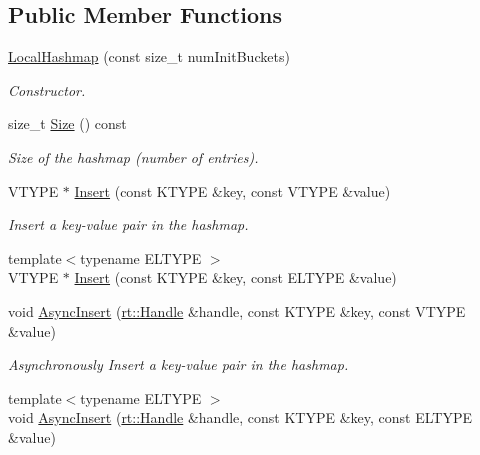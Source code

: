 \subsection*{Public Member Functions}
\begin{DoxyCompactItemize}
\item 
\hyperlink{classshad_1_1LocalHashmap_a6c0ce5d7583545126171e9de452b89d9}{Local\-Hashmap} (const size\-\_\-t num\-Init\-Buckets)
\begin{DoxyCompactList}\small\item\em Constructor. \end{DoxyCompactList}\item 
size\-\_\-t \hyperlink{classshad_1_1LocalHashmap_ac70c307f612b97f08f5e38bba7759665}{Size} () const 
\begin{DoxyCompactList}\small\item\em Size of the hashmap (number of entries). \end{DoxyCompactList}\item 
V\-T\-Y\-P\-E $\ast$ \hyperlink{classshad_1_1LocalHashmap_af3ef8afed1593bf034477b8692661b97}{Insert} (const K\-T\-Y\-P\-E \&key, const V\-T\-Y\-P\-E \&value)
\begin{DoxyCompactList}\small\item\em Insert a key-\/value pair in the hashmap. \end{DoxyCompactList}\item 
{\footnotesize template$<$typename E\-L\-T\-Y\-P\-E $>$ }\\V\-T\-Y\-P\-E $\ast$ \hyperlink{classshad_1_1LocalHashmap_ad8062ff16023002c7aee667f3fe4cfd2}{Insert} (const K\-T\-Y\-P\-E \&key, const E\-L\-T\-Y\-P\-E \&value)
\item 
void \hyperlink{classshad_1_1LocalHashmap_acb5581492e044c07bd0ceaa3a6892309}{Async\-Insert} (\hyperlink{classshad_1_1rt_1_1Handle}{rt\-::\-Handle} \&handle, const K\-T\-Y\-P\-E \&key, const V\-T\-Y\-P\-E \&value)
\begin{DoxyCompactList}\small\item\em Asynchronously Insert a key-\/value pair in the hashmap. \end{DoxyCompactList}\item 
{\footnotesize template$<$typename E\-L\-T\-Y\-P\-E $>$ }\\void \hyperlink{classshad_1_1LocalHashmap_ace0dd4d4a9caee1d915af6efcb4fc2c6}{Async\-Insert} (\hyperlink{classshad_1_1rt_1_1Handle}{rt\-::\-Handle} \&handle, const K\-T\-Y\-P\-E \&key, const E\-L\-T\-Y\-P\-E \&value)
\item 

\end{DoxyCompactItemize}

